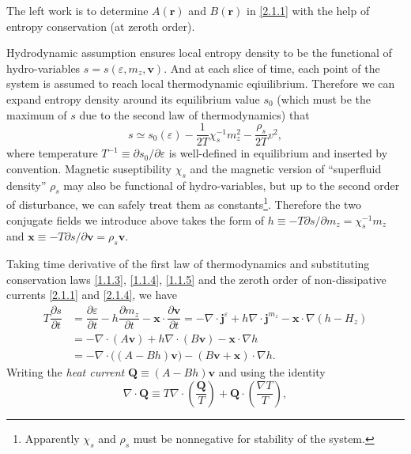 \documentclass[10pt,nofootinbib]{revtex4}
\begin{document}
			\indent The left work is to determine $A(\bm{r})$ and $B(\bm{r})$ in \eqref{2.1.1} with the help of entropy conservation (at zeroth order).\par
			Hydrodynamic assumption ensures local entropy density to be the functional of hydro-variables $s=s(\varepsilon,m_z,\bm{v})$. And at each slice of time, each point of the system is assumed to reach local thermodynamic eqiuilibrium. Therefore we can expand entropy density around its equilibrium value $s_0$ (which must be the maximum of $s$ due to the second law of thermodynamics) that 
			\begin{equation}\label{2.1.5}
				s\simeq s_0(\varepsilon)-\dfrac{1}{2T}\chi_s^{-1}m_z^2-\dfrac{\rho_s}{2T}v^2,
			\end{equation}
			where temperature $T^{-1}\equiv\partial s_0/\partial\varepsilon$ is well-defined in equilibrium and inserted by convention. Magnetic suseptibility $\chi_s$ and the magnetic version of ``superfluid density'' $\rho_s$ may also be functional of hydro-variables, but up to the second order of disturbance, we can safely treat them as constants\footnote{Apparently $\chi_s$ and $\rho_s$ must be nonnegative for stability of the system.}. Therefore the two conjugate fields we introduce above takes the form of $h\equiv-T \partial s/\partial m_z=\chi_s^{-1}m_z$ and $\bm{x}\equiv-T\partial s/\partial \bm{v}=\rho_s\bm{v}$.\par
			Taking time derivative of the first law of thermodynamics and substituting conservation laws \eqref{1.1.3}, \eqref{1.1.4}, \eqref{1.1.5} and the zeroth order of non-dissipative currents \eqref{2.1.1} and \eqref{2.1.4}, we have
			\begin{align}\label{2.1.6}
				T\dfrac{\partial s}{\partial t}&=\dfrac{\partial \varepsilon}{\partial t}-h\dfrac{\partial m_z}{\partial t}-\bm{x}\cdot\dfrac{\partial \bm{v}}{\partial t}=-\nabla\cdot\bm{j}^\varepsilon+h\nabla\cdot\bm{j}^{m_z}-\bm{x}\cdot\nabla(h-H_z)\nonumber\\
				&=-\nabla\cdot(A\bm{v})+h\nabla\cdot(B\bm{v})-\bm{x}\cdot\nabla h\nonumber\\
				&=-\nabla\cdot\bigg((A-Bh)\bm{v}\bigg)-(B\bm{v}+\bm{x})\cdot\nabla h.
			\end{align}
			Writing the \emph{heat current} $\bm{Q}\equiv (A-Bh)\bm{v}$ and using the identity
			\begin{equation*}
				\nabla\cdot\bm{Q}\equiv T\nabla\cdot \left(\dfrac{\bm{Q}}{T}\right)+\bm{Q}\cdot \left(\dfrac{\nabla T}{T}\right),  
			\end{equation*}
\end{document}

